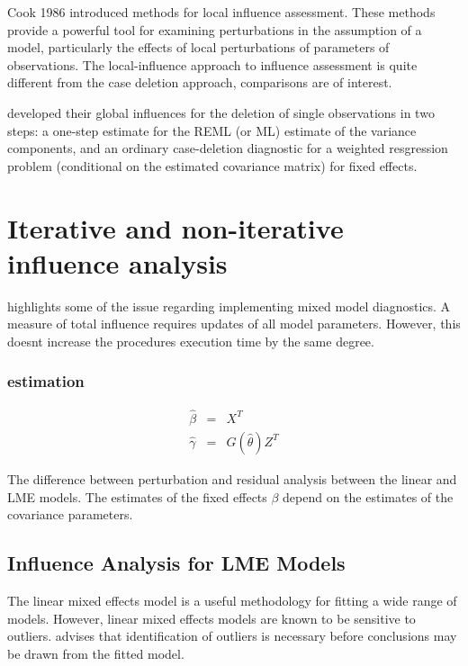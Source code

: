 \documentclass[12pt, a4paper]{report}
\theoremstyle{plain}
\theoremstyle{definition}
\theoremstyle{remark}
\begin{document}
Cook 1986 introduced methods for local influence assessment. These methods provide a powerful tool for examining perturbations in the assumption of a model, particularly the effects of local perturbations of parameters of observations. The local-influence approach to influence assessment is quite different from the case deletion approach, comparisons are of interest.

\citet{Christensen} developed their global influences for the deletion of single observations in two steps: a one-step estimate for the REML (or ML) estimate of the variance components, and an ordinary case-deletion diagnostic for a weighted resgression problem (conditional on the estimated covariance matrix) for fixed effects.









\section{Iterative and non-iterative influence analysis}
\citet{schabenberger} highlights some of the issue regarding implementing mixed model diagnostics.
A measure of total influence requires updates of all model parameters.
However, this doesnt increase the procedures execution time by the same degree.

\subsubsection{estimation}

\begin{eqnarray}
\hat{\beta} &=& X^{T} \\
\hat{\gamma} &=& G(\hat{\theta})Z^{T}
\end{eqnarray}

The difference between perturbation and residual analysis between the linear and LME models.
The estimates of the fixed effects $\beta$ depend on the estimates of the covariance parameters.




\subsection{Influence Analysis for LME Models} %
The linear mixed effects model is a useful methodology for fitting a wide range of models. However, linear mixed effects models are known to be sensitive to outliers. \citet{CPJ} advises that identification of outliers is necessary before conclusions may be drawn from the fitted model.
\end{document}
